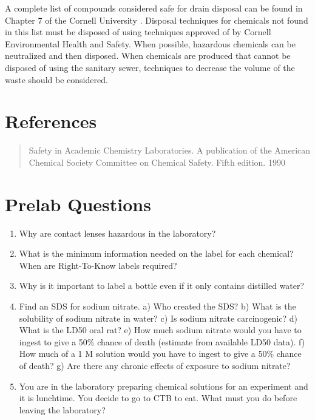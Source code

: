 \documentclass[letterpaper,10pt,english]{sphinxmanual}
\begin{document}
A complete list of compounds considered safe for drain disposal can be found in Chapter 7 of the Cornell University .  Disposal techniques for chemicals not found in this list must be disposed of using techniques approved of by Cornell Environmental Health and Safety. When possible, hazardous chemicals can be neutralized and then disposed. When chemicals are produced that cannot be disposed of using the sanitary sewer, techniques to decrease the volume of the waste should be considered.


\section{References}
\label{\detokenize{Laboratory_Safety/Laboratory_Safety:references}}\label{\detokenize{Laboratory_Safety/Laboratory_Safety:heading-laboratory-safety-references}}\begin{quote}

Safety in Academic Chemistry Laboratories. A publication of the American Chemical Society Committee on Chemical Safety. Fifth edition. 1990
\end{quote}


\section{Prelab Questions}
\label{\detokenize{Laboratory_Safety/Laboratory_Safety:prelab-questions}}\begin{enumerate}
\item {} 
Why are contact lenses hazardous in the laboratory?

\item {} 
What is the minimum information needed on the label for each chemical? When are Right-To-Know labels required?

\item {} 
Why is it important to label a bottle even if it only contains distilled water?

\item {} 
Find an SDS for sodium nitrate.  a) Who created the SDS? b) What is the solubility of sodium nitrate in water? c) Is sodium nitrate carcinogenic? d) What is the LD50 oral rat? e) How much sodium nitrate would you have to ingest to give a 50\% chance of death (estimate from available LD50 data). f) How much of a 1 M solution would you have to ingest to give a 50\% chance of death? g) Are there any chronic effects of exposure to sodium nitrate?

\item {} 
You are in the laboratory preparing chemical solutions for an experiment and it is lunchtime. You decide to go to CTB to eat. What must you do before leaving the laboratory?

\end{enumerate}
\end{document}
